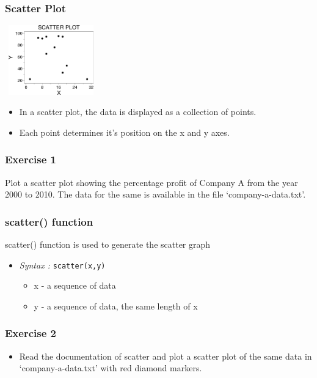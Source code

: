 \documentclass[17pt]{beamer}
\begin{document}
\begin{frame}
\frametitle{Scatter Plot}
\begin{center}
\includegraphics[width=4cm, height=3cm]{scatter-plot.png} 
\end{center}\begin{itemize}
\item In a scatter plot, the data is displayed as a collection of points.\pause
\item Each point determines it's position on the x and y axes. 
\end{itemize}
\end{frame}
\begin{frame}
\frametitle{Exercise 1}
Plot a scatter plot showing the percentage profit of Company A from the year 2000
to 2010. The data for the same is available in the file `company-a-data.txt'.
\end{frame}
\begin{frame}[fragile]
\frametitle{scatter() function}
scatter() function is used to generate the scatter graph \pause

\begin{itemize}
\item \emph{Syntax :} \texttt{scatter(x,y)}\pause
\begin{itemize}
\item x - a sequence of data\pause
\item y - a sequence of data, the same length of x
\end{itemize}
\end{itemize}
\end{frame}
\begin{frame}[fragile]
\frametitle{Exercise 2}
\begin{itemize}
\item Read the documentation of scatter and plot a scatter plot of the same data in `company-a-data.txt' with red diamond markers.
\end{itemize}
\end{frame}
\end{document}
